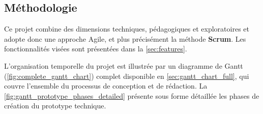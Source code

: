 \subsection{Méthodologie} \label{sec:méthodologie}

Ce projet combine des dimensions techniques, pédagogiques et exploratoires et adopte donc une approche Agile, et plus précisément la méthode \textbf{Scrum}.  
Les fonctionnalités visées sont présentées dans la \autoref{sec:features}.

L'organisation temporelle du projet est illustrée par un diagramme de Gantt (\autoref{fig:complete_gantt_chart}) complet disponible en \autoref{sec:gantt_chart_full}, qui couvre l’ensemble du processus de conception et de rédaction.
La \autoref{fig:gantt_prototype_phases_detailed} présente sous forme détaillée les phases de création du prototype technique.

